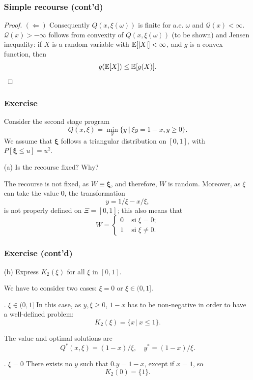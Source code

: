 \documentclass{beamer}
\def\bxi{\boldsymbol\xi}
\def\bxi{\boldsymbol\xi}
\begin{document}
\begin{frame}
\frametitle{Simple recourse (cont'd)}

\begin{proof}
{\bf $(\Leftarrow)$}
Consequently $Q(x,\xi(\omega))$ is finite for a.e. $\omega$ and $\mathcal{Q}(x) < \infty$.
$\mathcal{Q}(x) > -\infty$ follows from convexity of $Q(x,\xi(\omega))$ (to be shown) and Jensen inequality:  if $X$ is a random variable with ${\mathbb{E}}[|X|] < \infty$, and $g$ is a convex function, then
$$
g({\mathbb{E}}[X]) \leq {\mathbb{E}}[g(X)].
$$
\end{proof}

\end{frame}

\begin{frame}
\frametitle{Exercise}
	
Consider the second stage program
\[
Q(x, \xi) = \min_y \lbrace y \ |\ \xi y = 1-x, y \geq 0 \rbrace.
\]
We assume that $\bxi$ follows a triangular distribution on $[0,1]$, with $P[\bxi \leq u] = u^2$.
	
\mbox{}
	
{\blue (a)}
Is the recourse fixed? Why?
	
\mbox{}
	
The recourse is not fixed, as $W \equiv \bxi$, and therefore, $W$ is random.
Moreover, as $\xi$ can take the value 0, the transformation
\[
y = 1/\xi - x/\xi,
\]
is not properly defined on $\Xi = [0,1]$; this also means that
\[
W =
\begin{cases}
0 & \mbox{ si } \xi = 0; \\
1 & \mbox{ si } \xi \ne 0.
\end{cases}
\]
	
\end{frame}

\begin{frame}
\frametitle{Exercise (cont'd)}
	
{\blue (b)} Express $K_2(\xi)$ for all $\xi$ in $[0,1]$.
	
\mbox{}
	
We have to consider two cases: $\xi = 0$ or $\xi \in (0,1]$.
	
\mbox{}
	
{. $\xi \in (0,1]$} In this case, as $y, \xi \geq 0$, $1-x$ has to be non-negative in order to have a well-defined problem:
\[
K_2(\xi) = \lbrace x\,|\, x \leq 1 \rbrace.
\]

The value and optimal solutions are
\[
Q^*(x,\xi) = (1-x)/\xi,\quad y^*= (1-x)/\xi.
\]
	
{. $\xi=0$} There exists no $y$ such that $0.y = 1-x$, except if $x = 1$, so
\[
K_2(0) = \lbrace 1 \rbrace.
\]
	
\end{frame}
\end{document}
